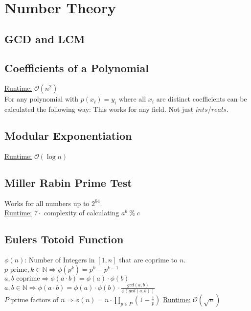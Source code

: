 \section{Number Theory}
\subsection{GCD and LCM}

\subsection{Coefficients of a Polynomial}
\underline{Runtime:} $\mathcal{O}(n^2)$ \\
For any polynomial with $p(x_i) = y_i$ where all $x_i$ are distinct
coefficients can be calculated the following way:
This works for any field. Not just $ints$/$reals$.
\subsection{Modular Exponentiation}
\underline{Runtime:} $\mathcal{O}(\log n)$

\subsection{Miller Rabin Prime Test}
Works for all numbers up to $2^64$.\\
\underline{Runtime:} $7\cdot$ complexity of calculating $a^b \; \% \; c$

\subsection{Eulers Totoid Function}
$\phi(n)$: Number of Integers in $[1, n]$ that are coprime to $n$.\\
$p \text{ prime}, k \in \mathbb{N} \Rightarrow \phi(p^k) = p^k - p^{k-1}$ \\
$a, b \text{ coprime} \Rightarrow \phi(a \cdot b) = \phi(a) \cdot \phi(b)$ \\
$a, b \in \mathbb{N} \Rightarrow \phi(a \cdot b) = \phi(a) \cdot \phi(b) \cdot \frac{gcd(a, b)}{\phi(gcd(a,b))}$ \\
$P \text{ prime factors of } n \Rightarrow \phi(n) = n \cdot \prod_{p \in P} (1 - \frac{1}{p})$
\underline{Runtime:} $\mathcal{O}(\sqrt{n})$
